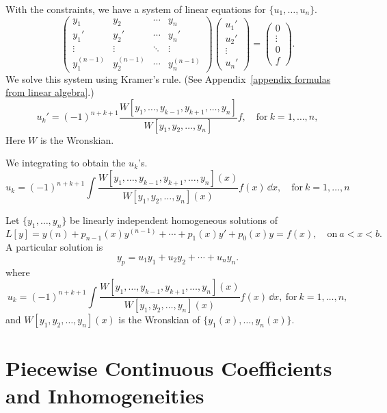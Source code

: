 With the constraints, we have a system of linear equations for
$\{ u_1, \ldots, u_n \}$.
\[
\begin{pmatrix}
  y_1 & y_2 & \cdots & y_n \\
  y_1' & y_2' & \cdots & y_n' \\
  \vdots & \vdots & \ddots & \vdots \\
  y_1^{(n-1)} & y_2^{(n-1)} & \cdots & y_n^{(n-1)} 
\end{pmatrix}
\begin{pmatrix}
  u_1' \\
  u_2' \\
  \vdots \\
  u_n'
\end{pmatrix}
=
\begin{pmatrix}
  0 \\
  \vdots \\
  0 \\
  f
\end{pmatrix}.
\]
We solve this system using Kramer's rule.
(See Appendix~\ref{appendix formulas from linear algebra}.)
\[
u_k' = (-1)^{n+k+1} \frac{W[y_1,\ldots,y_{k-1},y_{k+1},\ldots,y_n]}
{W[y_1,y_2,\ldots,y_n]} f, \quad \mathrm{for}\ k=1,\ldots,n,
\]
Here $W$ is the Wronskian.

We integrating to obtain the $u_k$'s.
\[ 
u_k = (-1)^{n+k+1} \int \frac{W[y_1,\ldots,y_{k-1},y_{k+1},\ldots,y_n](x)}
{W[y_1,y_2,\ldots,y_n](x)} f(x) \,\dd x, 
\quad \mathrm{for}\ k = 1,\ldots,n
\]



\begin{Result}
  \label{ionvop}
  Let $\{y_1,\ldots,y_n\}$ be linearly independent homogeneous solutions of
  \[
  L[y] = y{(n)} + p_{n-1}(x) y^{(n-1)} + \cdots + p_1(x) y' + p_0(x) y = f(x), 
  \quad \mathrm{on}\ a < x < b.
  \]
  A particular solution is
  \[
  y_p = u_1 y_1 + u_2 y_2 + \cdots + u_n y_n.
  \]
  where
  \[ 
  u_k = (-1)^{n+k+1} \int \frac{W[y_1,\ldots,y_{k-1},y_{k+1},\ldots,y_n](x)}
  {W[y_1,y_2,\ldots,y_n](x)} f(x) \,\dd x,\ 
  \mathrm{for}\ k = 1,\ldots,n,
  \]
  and $W[y_1,y_2,\ldots,y_n](x)$ is the Wronskian of $\{y_1(x),\ldots, y_n(x)\}$.
\end{Result}








\section{Piecewise Continuous Coefficients and Inhomogeneities}



